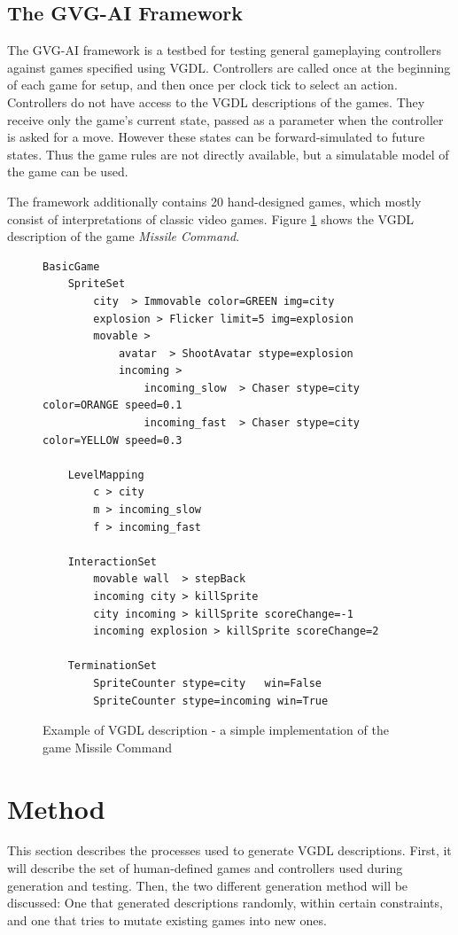\documentclass{llncs}
\begin{document}
\subsection{The GVG-AI Framework}

The GVG-AI framework is a testbed for testing general gameplaying controllers against games specified using VGDL. Controllers are called once at the beginning of each game for setup, and then once per clock tick to select an action. Controllers do not have access to the VGDL descriptions of the games. They receive only the game's current state, passed as a parameter when the controller is asked for a move. However these states can be forward-simulated to future states. Thus the game rules are not directly available, but a simulatable model of the game can be used.

The framework additionally contains 20 hand-designed games, which mostly consist of interpretations of classic video games. Figure \ref{fig:vgdl} shows the VGDL description of the game \emph{Missile Command}.


\begin{figure}[!ht]
\centering
\begin{lstlisting}
BasicGame
	SpriteSet
		city  > Immovable color=GREEN img=city
		explosion > Flicker limit=5 img=explosion
		movable >
			avatar  > ShootAvatar stype=explosion
			incoming >
				incoming_slow  > Chaser stype=city color=ORANGE speed=0.1
				incoming_fast  > Chaser stype=city color=YELLOW speed=0.3

	LevelMapping
		c > city
		m > incoming_slow
		f > incoming_fast
		
	InteractionSet
		movable wall  > stepBack
		incoming city > killSprite
		city incoming > killSprite scoreChange=-1
		incoming explosion > killSprite scoreChange=2

	TerminationSet
		SpriteCounter stype=city   win=False
		SpriteCounter stype=incoming win=True
\end{lstlisting}
\caption{Example of VGDL description - a simple implementation of the game Missile Command}
\label{fig:vgdl}
\end{figure}



\section{Method}
This section describes the processes used to generate VGDL descriptions. First, it will describe the set of human-defined games and controllers used during generation and testing. Then, the two different generation method will be discussed: One that generated descriptions randomly, within certain constraints, and one that tries to mutate existing games into new ones.
\end{document}
